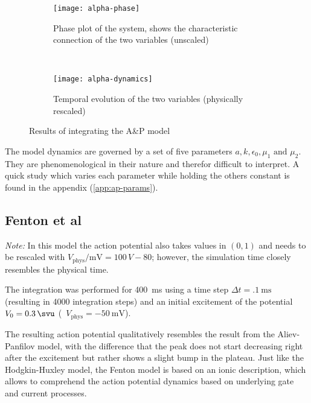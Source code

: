 \begin{figure}[h]
    \centering
    \begin{subfigure}[b]{.45\textwidth}
        \texttt{[image: alpha-phase]}
        \vspace{-\baselineskip}
        \caption{Phase plot of the system, shows the characteristic connection
        of the two variables (unscaled)}
        \label{fig:alphaphase}
    \end{subfigure}
    ~
    \begin{subfigure}[b]{.45\textwidth}
        \texttt{[image: alpha-dynamics]}
        \vspace{-\baselineskip}
        \caption{Temporal evolution of the two variables (physically rescaled)}
        \label{fig:alphadyn}
    \end{subfigure}
    \caption{Results of integrating the A\&P model}
    \label{fig:alpha1}
\end{figure}

The model dynamics are governed by a set of five parameters $a, k, \epsilon_0,
\mu_1\text{ and }\mu_2$. They are phenomenological in their nature and therefor
difficult to interpret. A quick study which varies each parameter while holding
the others constant is found in the appendix (\ref{app:ap-params}).


\subsection{Fenton et al}
\emph{Note:} In this model the action potential also takes values in $(0,1)$
and needs to be rescaled with $V_{\mathrm{phys}}/\si{\milli\volt}=100\,V-80$;
however, the simulation time closely resembles the physical time.

\vspace{\baselineskip}
The integration was performed for \SI{400}{\milli\second} using a time step
$\Delta{t}=\SI{.1}{\milli\second}$ (resulting in 4000 integration steps) and
an initial excitement of the potential $V_0=\SI{.3}{\svu}$
(\ie~$V_{\mathrm{phys}}=\SI{-50}{\milli\volt}$).

The resulting action potential qualitatively resembles the result from the
Aliev-Panfilov model, with the difference that the peak does not start
decreasing right after the excitement but rather shows a slight bump in the
plateau.
Just like the Hodgkin-Huxley model, the Fenton model is  based on an ionic
description, which allows to comprehend the action potential dynamics based on
underlying gate and current processes.

